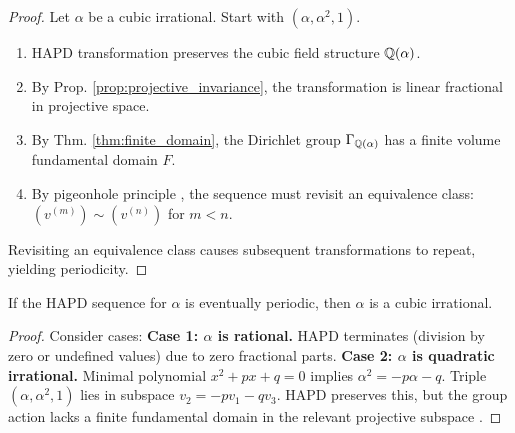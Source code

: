 \begin{proof}
Let $\alpha$ be a cubic irrational. Start with $(\alpha, \alpha^2, 1)$.
\begin{enumerate}
    \item HAPD transformation preserves the cubic field structure $\mathbb{Q}(\alpha)$.
    \item By Prop. \ref{prop:projective_invariance}, the transformation is linear fractional in projective space.
    \item By Thm. \ref{thm:finite_domain}, the Dirichlet group $\Gamma_{\mathbb{Q}(\alpha)}$ has a finite volume fundamental domain $F$.
    \item By pigeonhole principle \cite{Schmidt1980}, the sequence must revisit an equivalence class: $(v^{(m)}) \sim (v^{(n)})$ for $m < n$.
\end{enumerate}
Revisiting an equivalence class causes subsequent transformations to repeat, yielding periodicity.
\end{proof}

\begin{theorem}\label{thm:only_cubic_periodic}
If the HAPD sequence for $\alpha$ is eventually periodic, then $\alpha$ is a cubic irrational.
\end{theorem}

\begin{proof}
Consider cases:
\textbf{Case 1: $\alpha$ is rational.} HAPD terminates (division by zero or undefined values) due to zero fractional parts.
\textbf{Case 2: $\alpha$ is quadratic irrational.} Minimal polynomial $x^2+px+q=0$ implies $\alpha^2 = -p\alpha - q$. Triple $(\alpha, \alpha^2, 1)$ lies in subspace $v_2 = -pv_1 - qv_3$. HAPD preserves this, but the group action lacks a finite fundamental domain in the relevant projective subspace \cite{Khinchin1964}.
\end{proof}
